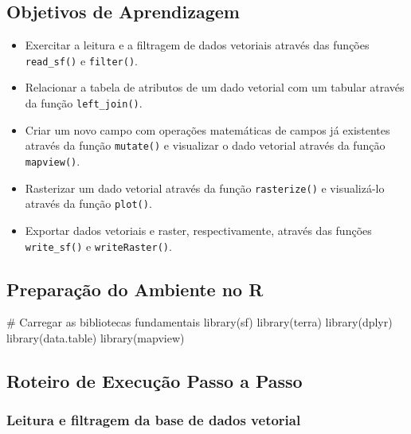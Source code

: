 \documentclass[
  letterpaper,
  DIV=11,
  numbers=noendperiod]{scrreprt}
\newenvironment{Shaded}{\begin{snugshade}}{\end{snugshade}}
\newcommand{\CommentTok}[1]{\textcolor[rgb]{0.37,0.37,0.37}{#1}}
\newcommand{\FunctionTok}[1]{\textcolor[rgb]{0.28,0.35,0.67}{#1}}
\newcommand{\NormalTok}[1]{\textcolor[rgb]{0.00,0.23,0.31}{#1}}
\begin{document}
\subsection{\texorpdfstring{\textbf{Objetivos de
Aprendizagem}}{Objetivos de Aprendizagem}}\label{objetivos-de-aprendizagem-1}

\begin{itemize}
\item
  Exercitar a leitura e a filtragem de dados vetoriais através das
  funções \texttt{read\_sf()} e \texttt{filter()}.
\item
  Relacionar a tabela de atributos de um dado vetorial com um tabular
  através da função \texttt{left\_join()}.
\item
  Criar um novo campo com operações matemáticas de campos já existentes
  através da função \texttt{mutate()} e visualizar o dado vetorial
  através da função \texttt{mapview()}.
\item
  Rasterizar um dado vetorial através da função \texttt{rasterize()} e
  visualizá-lo através da função \texttt{plot()}.
\item
  Exportar dados vetoriais e raster, respectivamente, através das
  funções \texttt{write\_sf()} e \texttt{writeRaster()}.
\end{itemize}

\subsection{\texorpdfstring{\textbf{Preparação do Ambiente no
R}}{Preparação do Ambiente no R}}\label{preparauxe7uxe3o-do-ambiente-no-r-1}

\begin{Shaded}
\begin{Highlighting}[]
\CommentTok{\# Carregar as bibliotecas fundamentais }
\FunctionTok{library}\NormalTok{(sf)}
\FunctionTok{library}\NormalTok{(terra)}
\FunctionTok{library}\NormalTok{(dplyr)}
\FunctionTok{library}\NormalTok{(data.table)}
\FunctionTok{library}\NormalTok{(mapview)}
\end{Highlighting}
\end{Shaded}

\subsection{\texorpdfstring{\textbf{Roteiro de Execução Passo a
Passo}}{Roteiro de Execução Passo a Passo}}\label{roteiro-de-execuuxe7uxe3o-passo-a-passo-1}

\subsubsection{\texorpdfstring{\textbf{Leitura e filtragem da base de
dados
vetorial}}{Leitura e filtragem da base de dados vetorial}}\label{leitura-e-filtragem-da-base-de-dados-vetorial}
\end{document}
